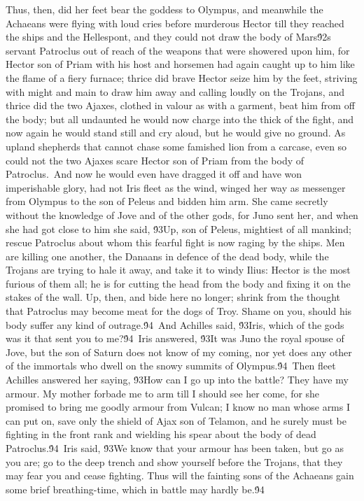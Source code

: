 {Thus, then, did her feet bear the goddess to Olympus, and meanwhile the Achaeans were flying with loud cries before murderous Hector till they reached the ships and the Hellespont, and they could not draw the body of Mars\'92s servant Patroclus out of reach of the weapons that were showered upon him, for Hector son of Priam with his host and horsemen had again caught up to him like the flame of a fiery furnace; thrice did brave Hector seize him by the feet, striving with might and main to draw him away and calling loudly on the Trojans, and thrice did the two Ajaxes, clothed in valour as with a garment, beat him from off the body; but all undaunted he would now charge into the thick of the fight, and now again he would stand still and cry aloud, but he would give no ground. As upland shepherds that cannot chase some famished lion from a carcase, even so could not the two Ajaxes scare Hector son of Priam from the body of Patroclus.\
And now he would even have dragged it off and have won imperishable glory, had not Iris fleet as the wind, winged her way as messenger from Olympus to the son of Peleus and bidden him arm. She came secretly without the knowledge of Jove and of the other gods, for Juno sent her, and when she had got close to him she said, \'93Up, son of Peleus, mightiest of all mankind; rescue Patroclus about whom this fearful fight is now raging by the ships. Men are killing one another, the Danaans in defence of the dead body, while the Trojans are trying to hale it away, and take it to windy Ilius: Hector is the most furious of them all; he is for cutting the head from the body and fixing it on the stakes of the wall. Up, then, and bide here no longer; shrink from the thought that Patroclus may become meat for the dogs of Troy. Shame on you, should his body suffer any kind of outrage.\'94\
And Achilles said, \'93Iris, which of the gods was it that sent you to me?\'94\
Iris answered, \'93It was Juno the royal spouse of Jove, but the son of Saturn does not know of my coming, nor yet does any other of the immortals who dwell on the snowy summits of Olympus.\'94\
Then fleet Achilles answered her saying, \'93How can I go up into the battle? They have my armour. My mother forbade me to arm till I should see her come, for she promised to bring me goodly armour from Vulcan; I know no man whose arms I can put on, save only the shield of Ajax son of Telamon, and he surely must be fighting in the front rank and wielding his spear about the body of dead Patroclus.\'94\
Iris said, \'93We know that your armour has been taken, but go as you are; go to the deep trench and show yourself before the Trojans, that they may fear you and cease fighting. Thus will the fainting sons of the Achaeans gain some brief breathing-time, which in battle may hardly be.\'94\
}
